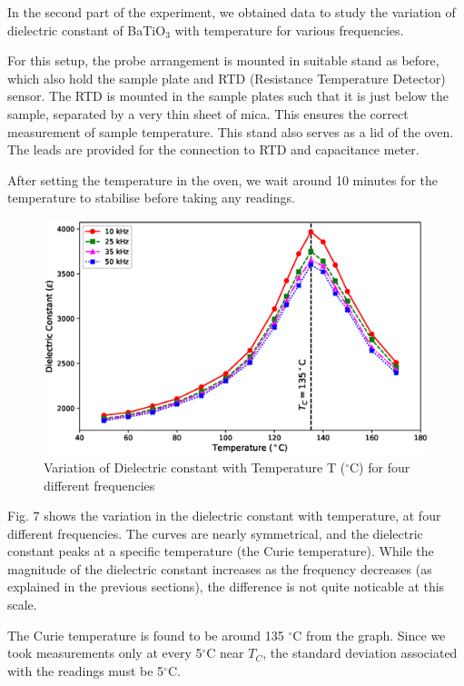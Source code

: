 In the second part of the experiment, we obtained
data to study the variation of dielectric constant
of BaTiO$_3$ with temperature for various frequencies.

For this setup, the probe arrangement is
mounted in suitable stand as before, which also hold the sample plate and RTD (Resistance Temperature Detector) sensor. The RTD is mounted in the sample plates such that it is just below the sample, separated by a very thin sheet of mica. This ensures the correct measurement of sample temperature. This stand also
serves as a lid of the oven. The leads are provided for the connection to RTD and capacitance meter. 

After setting the temperature in the oven, we wait around 10 minutes for the temperature to stabilise before taking any readings.

	
	
	
	
	\begin{figure}
		\centering
		\includegraphics[width=1.5\columnwidth]{images/temp.eps}
		\caption{Variation of Dielectric constant with Temperature T ($^\circ$C) for four different frequencies}
		\label{graph:5}
	\end{figure}

	Fig. 7 shows the variation in the dielectric constant with temperature, at four different frequencies. The curves are nearly symmetrical, and the dielectric constant peaks at a specific temperature (the Curie temperature). While the magnitude of the dielectric constant increases as the frequency decreases (as explained in the previous sections), the difference is not quite noticable at this scale.
	
	The Curie temperature is found to be around 135 $^\circ$C from the graph. Since we took measurements only at every 5$^\circ$C near $T_C$, the standard deviation associated with the readings must be 5$^\circ$C.  
	
